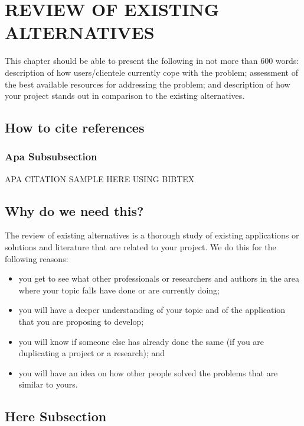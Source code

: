 \section{REVIEW OF EXISTING ALTERNATIVES}
                This chapter should be able to present the following in not more than 600 words: description of how users/clientele currently cope with the problem; assessment of the best available resources for addressing the problem; and description of how your project stands out in comparison to the existing alternatives.
			\subsection{How to cite references}
				\lipsum[4]
				\subsubsection{Apa Subsubsection}
					APA CITATION SAMPLE HERE USING BIBTEX \citep{CrescenziKann1997}
			\subsection{Why do we need this?}
    			The review of existing alternatives is a thorough study of existing applications or solutions and literature that are related to your project. We do this for the following reasons:
                    \begin{itemize}
                        \item you get to see what other professionals or researchers and authors in the area where your topic falls have done or are currently doing;
                        \item you will have a deeper understanding of your topic and of the application that you are proposing to develop;
                        \item you will know if someone else has already done the same (if you are duplicating a project or a research); and
                        \item you will have an idea on how other people solved the problems that are similar to yours.
                    \end{itemize}

			\subsection{Here Subsection}
				\lipsum[6]